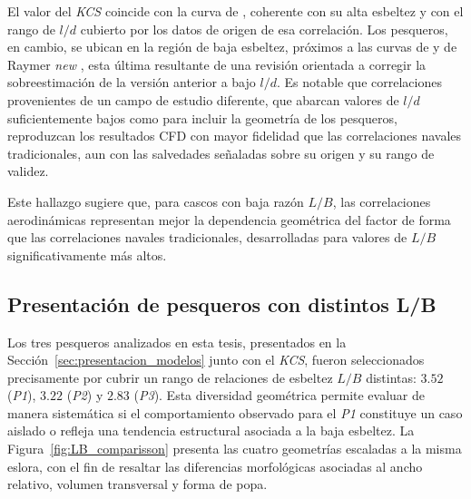 El valor del \textit{KCS} coincide con la curva de \citet{hoerner1965drag},
coherente con su alta esbeltez y con el rango de $l/d$ cubierto por los datos
de origen de esa correlación. Los pesqueros, en cambio, se ubican en la región
de baja esbeltez, próximos a las curvas de \citet{roskam1987airplane} y de
Raymer \textit{new} \citep{raymer2019aircraft}, esta última resultante de una
revisión orientada a corregir la sobreestimación de la versión anterior a
bajo $l/d$. Es notable que correlaciones provenientes de un campo de estudio
diferente, que abarcan valores de $l/d$ suficientemente bajos como para
incluir la geometría de los pesqueros, reproduzcan los resultados CFD con
mayor fidelidad que las correlaciones navales tradicionales, aun con las
salvedades señaladas sobre su origen y su rango de validez.

Este hallazgo sugiere que, para cascos con baja razón $L/B$, las
correlaciones aerodinámicas representan mejor la dependencia geométrica del
factor de forma que las correlaciones navales tradicionales, desarrolladas
para valores de $L/B$ significativamente más altos.


\subsection{Presentación de pesqueros con distintos L/B}

Los tres pesqueros analizados en esta tesis, presentados en la 
Sección~\ref{sec:presentacion_modelos} junto con el \textit{KCS}, fueron 
seleccionados precisamente por cubrir un rango de relaciones de esbeltez 
$L/B$ distintas: $3{.}52$ (\textit{P1}), $3{.}22$ (\textit{P2}) y 
$2{.}83$ (\textit{P3}). Esta diversidad geométrica permite evaluar de 
manera sistemática si el comportamiento observado para el \textit{P1} 
constituye un caso aislado o refleja una tendencia estructural asociada 
a la baja esbeltez. La Figura~\ref{fig:LB_comparisson} presenta las 
cuatro geometrías escaladas a la misma eslora, con el fin de resaltar 
las diferencias morfológicas asociadas al ancho relativo, volumen 
transversal y forma de popa.

